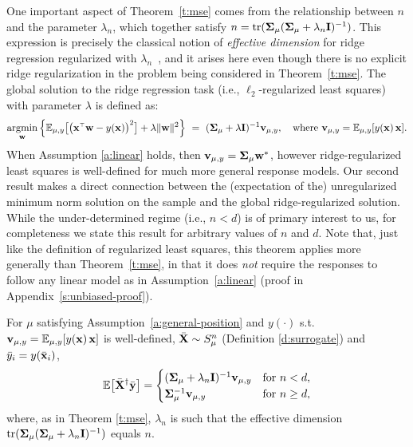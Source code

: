 \documentclass[11pt]{article}
\begin{document}
One important aspect of Theorem~\ref{t:mse} comes from the relationship between $n$ and the parameter $\lambda_n$, which together satisfy $n=\mathrm{tr}(\mathbf{\Sigma}_\mu (\mathbf{\Sigma}_\mu+\lambda_n\mathbf I)^{-1})$.
This expression is precisely the classical notion of \emph{effective
  dimension} for ridge regression regularized with
$\lambda_n$~\citep{ridge-leverage-scores}, and it arises here even though there is
no explicit ridge regularization in the problem being considered in
Theorem~\ref{t:mse}.
The global solution to the ridge regression task (i.e., $\ell_2$-regularized
least squares) with parameter $\lambda$ is defined as:
\begin{align*}
  \argmin_\w \Big\{\E_{\mu,y}\big[\big(\x^\top\w-y(\x)\big)^2\big]
  + \lambda\|\w\|^2\Big\}\ =\ (\Sigmab_\mu +
  \lambda\I)^{-1}\v_{\mu,y},\quad\text{where } \v_{\mu,y}=\E_{\mu,y}[y(\x)\,\x ].
\end{align*}
When Assumption \ref{a:linear} holds, then
$\mathbf v_{\mu,y}=\mathbf{\Sigma}_\mu\mathbf w^*$, however ridge-regularized least squares
is well-defined for much more general response models.
Our second result makes a direct connection between the (expectation
of the) unregularized minimum norm solution on the sample
and the global ridge-regularized solution.
While the under-determined regime (i.e., $n<d$) is of primary interest to us,
for completeness we state this result for arbitrary values of $n$ and $d$.
Note that, just like the definition of regularized least squares, this
theorem applies more generally than Theorem~\ref{t:mse}, in that it
does \emph{not} require the responses to follow any linear model as in
Assumption~\ref{a:linear} (proof in Appendix~\ref{s:unbiased-proof}).
\begin{theorem}
  \label{t:unbiased}
  For $\mu$ satisfying
  Assumption~\ref{a:general-position} and
  $y(\cdot)$ s.t.~$\mathbf v_{\mu,y}=\mathbb E_{\mu,y}[y(\mathbf x)\,\mathbf x]$ is well-defined,
  ${\bar{\mathbf X}}\sim S_\mu^n$ (Definition \ref{d:surrogate}) and ${\bar y}_i=y(\bar{\mathbf x}_i)$,
  \begin{align*}
    \mathbb E\big[{\bar{\mathbf X}}^\dagger\bar{\mathbf y}\big] =
    \begin{cases}
      (\mathbf{\Sigma}_\mu + \lambda_n\mathbf I)^{-1}\mathbf v_{\mu,y} & \text{for }n<d,     \\
      \mathbf{\Sigma}_\mu^{-1}\mathbf v_{\mu,y}                 & \text{for }n \ge d,
    \end{cases}
  \end{align*}
  where, as in Theorem \ref{t:mse}, $\lambda_n$ is such that the effective dimension
  $\mathrm{tr}(\mathbf{\Sigma}_\mu(\mathbf{\Sigma}_\mu+\lambda_n\mathbf I)^{-1})$ equals $n$.
\end{theorem}
\end{document}
